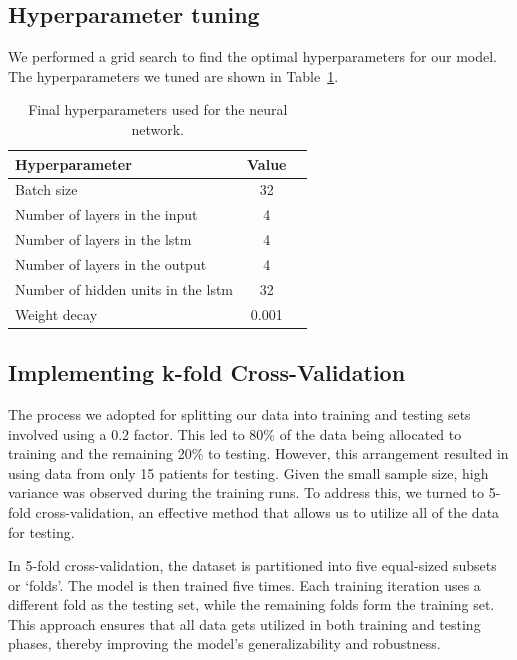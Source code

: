 \subsection{Hyperparameter tuning}

We performed a grid search to find the optimal hyperparameters for our model.
The hyperparameters we tuned are shown in
Table~\ref{tab:final-hyperparameters}.

\begin{table}[h]
	\centering
	\begin{tabular}{l c c}
		\toprule
		\textbf{Hyperparameter}                  & \textbf{Value} \\
		\midrule
		Batch size                               & 32             \\
		Number of layers in the input            & 4              \\
		Number of layers in the \gls{lstm}       & 4              \\
		Number of layers in the output           & 4              \\
		Number of hidden units in the \gls{lstm} & 32             \\
		Weight decay                             & 0.001          \\
		\bottomrule
	\end{tabular}
	\caption{Final hyperparameters used for the neural network.}
	\label{tab:final-hyperparameters}
\end{table}

\subsection{Implementing k-fold Cross-Validation}

The process we adopted for splitting our data into training and testing sets
involved using a 0.2 factor. This led to 80\% of the data being allocated to
training and the remaining 20\% to testing. However, this arrangement resulted
in using data from only 15 patients for testing. Given the small sample size,
high variance was observed during the training runs. To address this, we turned
to 5-fold cross-validation, an effective method that allows us to utilize all
of the data for testing.

In 5-fold cross-validation, the dataset is partitioned into five equal-sized
subsets or `folds'. The model is then trained five times. Each training
iteration uses a different fold as the testing set, while the remaining folds
form the training set. This approach ensures that all data gets utilized in
both training and testing phases, thereby improving the model's
generalizability and robustness.

